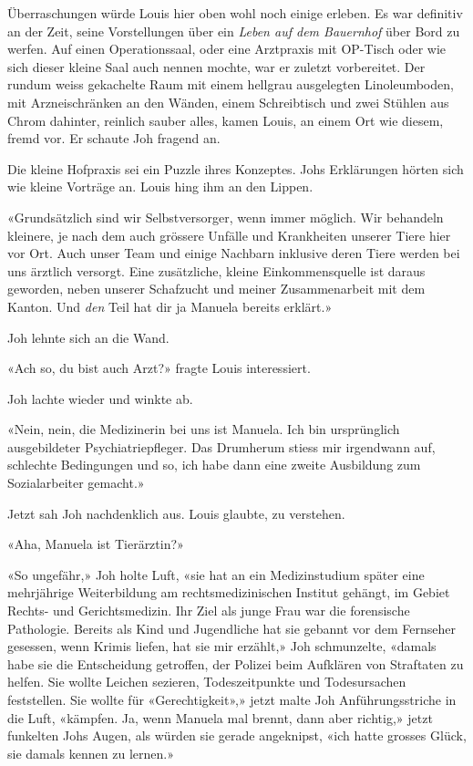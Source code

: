 Überraschungen würde Louis hier oben wohl noch einige erleben. Es war
definitiv an der Zeit, seine Vorstellungen über ein \emph{Leben auf dem
Bauernhof} über Bord zu werfen. Auf einen Operationssaal, oder eine
Arztpraxis mit OP-Tisch oder wie sich dieser kleine Saal auch nennen
mochte, war er zuletzt vorbereitet. Der rundum weiss gekachelte Raum mit
einem hellgrau ausgelegten Linoleumboden, mit Arzneischränken an den
Wänden, einem Schreibtisch und zwei Stühlen aus Chrom dahinter, reinlich
sauber alles, kamen Louis, an einem Ort wie diesem, fremd vor. Er
schaute Joh fragend an.

Die kleine Hofpraxis sei ein Puzzle ihres Konzeptes. Johs Erklärungen
hörten sich wie kleine Vorträge an. Louis hing ihm an den Lippen.

«Grundsätzlich sind wir Selbstversorger, wenn immer möglich. Wir
behandeln kleinere, je nach dem auch grössere Unfälle und Krankheiten
unserer Tiere hier vor Ort. Auch unser Team und einige Nachbarn
inklusive deren Tiere werden bei uns ärztlich versorgt. Eine
zusätzliche, kleine Einkommensquelle ist daraus geworden, neben unserer
Schafzucht und meiner Zusammenarbeit mit dem Kanton. Und \emph{den} Teil
hat dir ja Manuela bereits erklärt.»

Joh lehnte sich an die Wand.

«Ach so, du bist auch Arzt?» fragte Louis interessiert.

Joh lachte wieder und winkte ab.

«Nein, nein, die Medizinerin bei uns ist Manuela. Ich bin ursprünglich
ausgebildeter Psychiatriepfleger. Das Drumherum stiess mir irgendwann
auf, schlechte Bedingungen und so, ich habe dann eine zweite Ausbildung
zum Sozialarbeiter gemacht.»

Jetzt sah Joh nachdenklich aus. Louis glaubte, zu verstehen.

«Aha, Manuela ist Tierärztin?»

«So ungefähr,» Joh holte Luft, «sie hat an ein Medizinstudium später
eine mehrjährige Weiterbildung am rechtsmedizinischen Institut gehängt,
im Gebiet Rechts- und Gerichtsmedizin. Ihr Ziel als junge Frau war die
forensische Pathologie. Bereits als Kind und Jugendliche hat sie gebannt
vor dem Fernseher gesessen, wenn Krimis liefen, hat sie mir erzählt,»
Joh schmunzelte, «damals habe sie die Entscheidung getroffen, der
Polizei beim Aufklären von Straftaten zu helfen. Sie wollte Leichen
sezieren, Todeszeitpunkte und Todesursachen feststellen. Sie wollte für
«Gerechtigkeit»,» jetzt malte Joh Anführungsstriche in die Luft,
«kämpfen. Ja, wenn Manuela mal brennt, dann aber richtig,» jetzt
funkelten Johs Augen, als würden sie gerade angeknipst, «ich hatte
grosses Glück, sie damals kennen zu lernen.»

